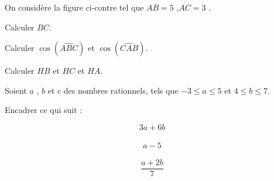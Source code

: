 \documentclass[a4paper,addpoints,12pt]{exam}
\begin{document}
\devoir[sem=2,prv=false,ds=true,num=5 ,niv=2 ,date=09/05/2023]

\begin{exo}[8]
\begin{minipage}{.65\linewidth}
On considère la figure ci-contre tel que $AB=5$ ,$AC=3$ .
\begin{questions}
\question[2] Calculer  $BC$.

\anserline[4]
\end{questions}
\end{minipage}
\begin{minipage}{.35\linewidth}
\end{minipage}
\begin{questions}
\setcounter{question}{1}
\question[3] Calculer $\cos(\widehat{ABC})$ et $\cos(\widehat{CAB})$.
\begin{multicols}{2}
\anserline[2]
\columnbreak

\anserline[2]
\end{multicols}
\question[3] Calculer $HB$ et $HC$ et $HA$.
\begin{multicols}{3}
\anserline[3]
\columnbreak

\anserline[3]
\columnbreak

\anserline[3]
\end{multicols}
\end{questions}
\end{exo}

\begin{exo}[6]
Soient $a$ , $b$ et $c$ des nombres rationnels, tels que $-3\leq a \leq 5$ et $4\leq b \leq 7$.
\begin{questions}
\question[6] Encadrer ce qui suit :\vspace{-1cm}
\begin{multicols}{3}
\[3a+6b\]\\ \anserline[3]
\[a-5\]\\ \anserline[3]
\[\frac{a+2b}{7}\]\\ \anserline[3]
\end{multicols}
\end{questions}
\end{exo}
\end{document}
